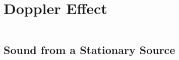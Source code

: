   
%
%  
%
%
%
%
\section{Doppler Effect}
%
%  
\begin{equation}
\end{equation}
%
%
%
%
\subsection{Sound from a Stationary Source}


